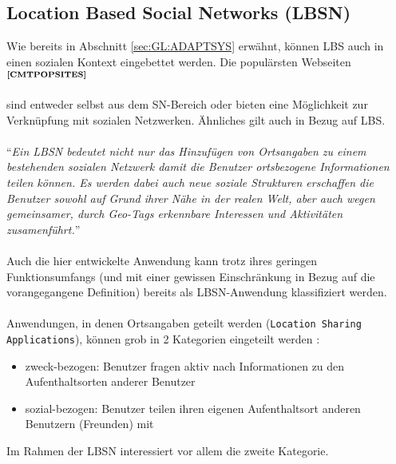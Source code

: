 \subsection{Location Based Social Networks (LBSN)}\label{3_LBSN}
Wie bereits in Abschnitt \ref{sec:GL:ADAPTSYS} erwähnt, können LBS auch in einen sozialen Kontext eingebettet werden. Die populärsten Webseiten$^{\textbf{\ref{CMTPOPSITES}}}$%
\addtocounter{footnote}{1}%
sind entweder selbst aus dem SN-Bereich oder bieten eine Möglichkeit zur Verknüpfung mit sozialen Netzwerken. Ähnliches gilt auch in Bezug auf LBS.\\ \\
"`\textit{Ein LBSN bedeutet nicht nur das Hinzufügen von Ortsangaben zu einem bestehenden sozialen Netzwerk damit die Benutzer ortsbezogene Informationen teilen können. Es werden dabei auch neue soziale Strukturen erschaffen die Benutzer sowohl auf Grund ihrer Nähe in der realen Welt, aber auch wegen gemeinsamer, durch Geo-Tags erkennbare Interessen und Aktivitäten zusamenführt.}"'\cite{ZHENG:LBSNTUT}\\ \\
Auch die hier entwickelte Anwendung kann trotz ihres geringen Funktionsumfangs (und mit einer gewissen Einschränkung in Bezug auf die vorangegangene Definition) bereits als LBSN-Anwendung klassifiziert werden.\\ \\
Anwendungen, in denen Ortsangaben geteilt werden (\texttt{Location Sharing Applications}), können grob in 2 Kategorien
eingeteilt werden \cite{LINETAL:4SQ}:
\begin{itemize}[leftmargin=*,noitemsep,topsep=1ex,parsep=0pt,partopsep=0pt]
\item zweck-bezogen: Benutzer fragen aktiv nach Informationen zu den Aufenthaltsorten anderer Benutzer
\item sozial-bezogen: Benutzer teilen ihren eigenen Aufenthaltsort anderen Benutzern (Freunden) mit
\end{itemize}
Im Rahmen der LBSN interessiert vor allem die zweite Kategorie.
